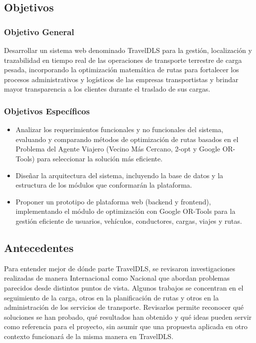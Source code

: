 \subsection{Objetivos}
\label{sec:objetivos}

\subsubsection{Objetivo General}
 Desarrollar un sistema web denominado TravelDLS para la gestión, localización y trazabilidad en tiempo real de las operaciones de transporte terrestre de carga pesada, incorporando la optimización matemática de rutas para fortalecer los procesos administrativos y logísticos de las empresas transportistas y brindar mayor transparencia a los clientes durante el traslado de sus cargas.

\subsubsection{Objetivos Específicos}
\label{sec:objetivos-especificos}
\begin{itemize}
	\item Analizar los requerimientos funcionales y no funcionales del sistema, evaluando y comparando métodos de optimización de rutas basados en el Problema del Agente Viajero (Vecino Más Cercano, 2-opt y Google OR-Tools) para seleccionar la solución más eficiente.
	\item Diseñar la arquitectura del sistema, incluyendo la base de datos y la estructura de los módulos que conformarán la plataforma.
	\item Proponer un prototipo de plataforma web (backend y frontend), implementando el módulo de optimización con Google OR-Tools para la gestión eficiente de usuarios, vehículos, conductores, cargas, viajes y rutas.
\end{itemize}

\subsection{Antecedentes}
\label{sec:antecedentes}

Para entender mejor de dónde parte TravelDLS, se revisaron investigaciones realizadas de manera Internacional como Nacional que abordan problemas parecidos desde distintos puntos de vista. Algunos trabajos se concentran en el seguimiento de la carga, otros en la planificación de rutas y otros en la administración de los servicios de transporte. Revisarlos permite reconocer qué soluciones se han probado, qué resultados han obtenido y qué ideas pueden servir como referencia para el proyecto, sin asumir que una propuesta aplicada en otro contexto funcionará de la misma manera en TravelDLS.

